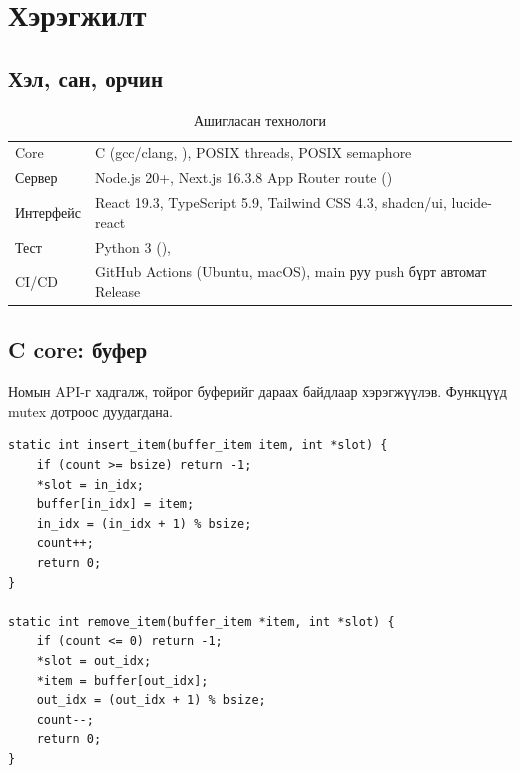 \documentclass[12pt,a4paper]{article}
\begin{document}
\section{Хэрэгжилт}

\subsection{Хэл, сан, орчин}
\begin{table}[H]\centering\small
\caption{Ашигласан технологи}\label{tab:tech}
\begin{tabular}{|L{0.28\textwidth}|L{0.72\textwidth}|}\hline
{} &  \\\hline
Core & C (gcc/clang, ), POSIX threads, POSIX semaphore \\\hline
Сервер & Node.js 20+, Next.js 16.3.8 App Router route () \\\hline
Интерфейс & React 19.3, TypeScript 5.9, Tailwind CSS 4.3, shadcn/ui, lucide-react \\\hline
Тест & Python 3 (),  \\\hline
CI/CD & GitHub Actions (Ubuntu, macOS), main руу push бүрт автомат Release \\\hline
\end{tabular}
\end{table}

\subsection{C core: буфер}
Номын API-г хадгалж, тойрог буферийг дараах байдлаар хэрэгжүүлэв. Функцүүд mutex дотроос дуудагдана.

\begin{lstlisting}[title={\textbf{Код 2.} \texttt{insert\_item} ба \texttt{remove\_item} (src/core/pc.c)}]
static int insert_item(buffer_item item, int *slot) {
    if (count >= bsize) return -1;
    *slot = in_idx;
    buffer[in_idx] = item;
    in_idx = (in_idx + 1) % bsize;
    count++;
    return 0;
}

static int remove_item(buffer_item *item, int *slot) {
    if (count <= 0) return -1;
    *slot = out_idx;
    *item = buffer[out_idx];
    out_idx = (out_idx + 1) % bsize;
    count--;
    return 0;
}
\end{lstlisting}
\end{document}

